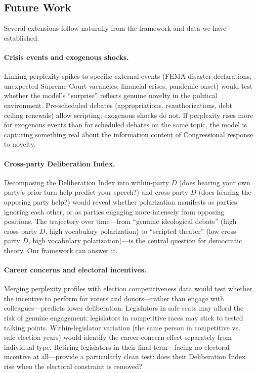 \documentclass[12pt]{article}
\newcommand{\DI}{\mathit{D}}
\begin{document}
\subsection{Future Work}

Several extensions follow naturally from the framework and data we have established.

\paragraph{Crisis events and exogenous shocks.} Linking perplexity spikes to specific external events (FEMA disaster declarations, unexpected Supreme Court vacancies, financial crises, pandemic onset) would test whether the model's ``surprise'' reflects genuine novelty in the political environment. Pre-scheduled debates (appropriations, reauthorizations, debt ceiling renewals) allow scripting; exogenous shocks do not. If perplexity rises more for exogenous events than for scheduled debates on the same topic, the model is capturing something real about the information content of Congressional response to novelty.

\paragraph{Cross-party Deliberation Index.} Decomposing the Deliberation Index into within-party $\DI$ (does hearing your own party's prior turn help predict your speech?) and cross-party $\DI$ (does hearing the opposing party help?) would reveal whether polarization manifests as parties ignoring each other, or as parties engaging more intensely from opposing positions. The trajectory over time---from ``genuine ideological debate'' (high cross-party $\DI$, high vocabulary polarization) to ``scripted theater'' (low cross-party $\DI$, high vocabulary polarization)---is the central question for democratic theory. Our framework can answer it.

\paragraph{Career concerns and electoral incentives.} Merging perplexity profiles with election competitiveness data would test whether the incentive to perform for voters and donors---rather than engage with colleagues---predicts lower deliberation. Legislators in safe seats may afford the risk of genuine engagement; legislators in competitive races may stick to tested talking points. Within-legislator variation (the same person in competitive vs. safe election years) would identify the career-concern effect separately from individual type. Retiring legislators in their final term---facing no electoral incentive at all---provide a particularly clean test: does their Deliberation Index rise when the electoral constraint is removed?
\end{document}
